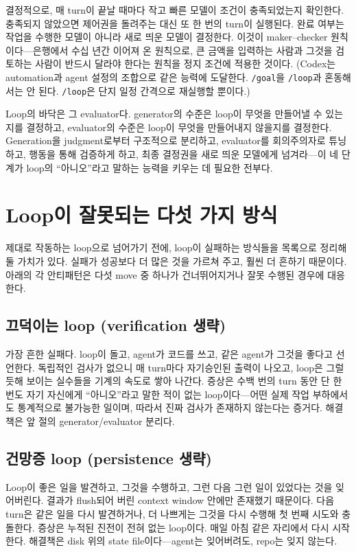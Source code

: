 \documentclass[conference]{IEEEtran}
\begin{document}
결정적으로, 매 turn이 끝날 때마다 작고 빠른 모델이 조건이 충족되었는지 확인한다. 충족되지 않았으면 제어권을 돌려주는 대신 또 한 번의 turn이 실행된다. 완료 여부는 작업을 수행한 모델이 아니라 새로 띄운 모델이 결정한다. 이것이 maker--checker 원칙이다---은행에서 수십 년간 이어져 온 원칙으로, 큰 금액을 입력하는 사람과 그것을 검토하는 사람이 반드시 달라야 한다는 원칙을 정지 조건에 적용한 것이다. (Codex는 automation과 agent 설정의 조합으로 같은 능력에 도달한다. \texttt{/goal}을 \texttt{/loop}과 혼동해서는 안 된다. \texttt{/loop}은 단지 일정 간격으로 재실행할 뿐이다.)

Loop의 바닥은 그 evaluator다. generator의 수준은 loop이 무엇을 만들어낼 수 있는지를 결정하고, evaluator의 수준은 loop이 무엇을 만들어내지 않을지를 결정한다. Generation을 judgment로부터 구조적으로 분리하고, evaluator를 회의주의자로 튜닝하고, 행동을 통해 검증하게 하고, 최종 결정권을 새로 띄운 모델에게 넘겨라---이 네 단계가 loop의 ``아니오''라고 말하는 능력을 키우는 데 필요한 전부다.

\section{Loop이 잘못되는 다섯 가지 방식}
제대로 작동하는 loop으로 넘어가기 전에, loop이 실패하는 방식들을 목록으로 정리해 둘 가치가 있다. 실패가 성공보다 더 많은 것을 가르쳐 주고, 훨씬 더 흔하기 때문이다. 아래의 각 안티패턴은 다섯 move 중 하나가 건너뛰어지거나 잘못 수행된 경우에 대응한다.

\subsection{끄덕이는 loop (verification 생략)}
가장 흔한 실패다. loop이 돌고, agent가 코드를 쓰고, 같은 agent가 그것을 좋다고 선언한다. 독립적인 검사가 없으니 매 turn마다 자기승인된 출력이 나오고, loop은 그럴듯해 보이는 실수들을 기계의 속도로 쌓아 나간다. 증상은 수백 번의 turn 동안 단 한 번도 자기 자신에게 ``아니오''라고 말한 적이 없는 loop이다---어떤 실제 작업 부하에서도 통계적으로 불가능한 일이며, 따라서 진짜 검사가 존재하지 않는다는 증거다. 해결책은 앞 절의 generator/evaluator 분리다.

\subsection{건망증 loop (persistence 생략)}
Loop이 좋은 일을 발견하고, 그것을 수행하고, 그런 다음 그런 일이 있었다는 것을 잊어버린다. 결과가 flush되어 버린 context window 안에만 존재했기 때문이다. 다음 turn은 같은 일을 다시 발견하거나, 더 나쁘게는 그것을 다시 수행해 첫 번째 시도와 충돌한다. 증상은 누적된 진전이 전혀 없는 loop이다. 매일 아침 같은 자리에서 다시 시작한다. 해결책은 disk 위의 state file이다---agent는 잊어버려도, repo는 잊지 않는다.
\end{document}
